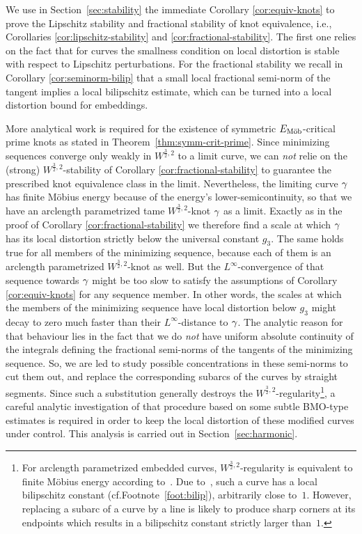 We use in Section~\ref{sec:stability} the immediate Corollary
\ref{cor:equiv-knots} to prove the Lipschitz stability and fractional stability
of knot equivalence, i.e., Corollaries \ref{cor:lipschitz-stability} and
\ref{cor:fractional-stability}. The first one relies on the fact that for curves the smallness condition on local 
distortion  
is stable with respect to Lipschitz perturbations. 
For
the fractional stability we recall in Corollary \ref{cor:seminorm-bilip}
that a small local fractional semi-norm of the
tangent implies a local bilipschitz estimate, which can be turned into a local
distortion bound for embeddings.

More analytical work is required for the existence
of symmetric ${E_\textnormal{M\"ob}}$-critical prime knots as stated in
Theorem~\ref{thm:symm-crit-prime}. Since minimizing sequences converge only
weakly in $W^{\frac32,2}$ to a 
limit curve, we can \emph{not} relie on the (strong) 
$W^{\frac32,2}$-stability of Corollary \ref{cor:fractional-stability} to
guarantee the prescribed knot equivalence class in the limit. Nevertheless, 
the limiting
curve $\gamma$ has finite M\"obius energy because of the energy's lower-semicontinuity, 
so that we have
an arclength parametrized tame
$W^{\frac32,2}$-knot $\gamma$ as a limit. Exactly as in the proof of
Corollary \ref{cor:fractional-stability} we therefore find a scale  at which
$\gamma$ has its local distortion strictly
below the universal constant
$g_3$. The same holds true for all members of
the minimizing sequence, because each of them is an arclength parametrized
$W^{\frac32,2}$-knot as well. But the $L^\infty$-convergence of that sequence
towards $\gamma$ might be too slow to satisfy the assumptions of Corollary \ref{cor:equiv-knots}
for any sequence member.
In other words, the scales at which 
the members of the minimizing sequence have local 
distortion below $g_3$
might decay to zero much faster than their $L^\infty$-distance to $\gamma$. 
The analytic reason for that behaviour lies in the fact that we do \emph{not}
have uniform absolute continuity of the integrals defining the fractional
semi-norms of the tangents of the minimizing sequence. So, we are led to 
study possible concentrations in these semi-norms to cut them out, and replace
the corresponding subarcs of the curves by straight segments. Since such a substitution
generally destroys the $W^{\frac32,2}$-regularity\footnote{\label{foot:harmonic-substitution}For arclength parametrized embedded curves, $W^{\frac32,2}$-regularity is equivalent to finite Möbius energy according to~\cite{blatt_2012a}.
Due to~\cite[Corollary~1.3]{freedman-etal_1994}, such a curve has a local bilipschitz constant (cf.\@ Footnote~\ref{foot:bilip}), arbitrarily close to~$1$.
However, replacing a subarc of a curve 
by a line is likely to produce sharp corners at its endpoints
which results in a bilipschitz constant strictly larger 
than~$1$.},
a careful analytic
investigation of that
procedure based on some subtle BMO-type estimates
is required in order to keep the local
distortion of these modified curves under control. This analysis is carried out
in Section~\ref{sec:harmonic}.

